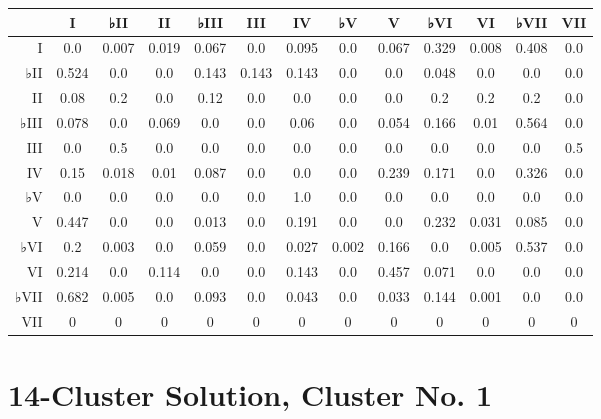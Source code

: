 \begin{table}[htbp]
\begin{minipage}{\linewidth}
\setlength{\tymax}{0.5\linewidth}
\centering
\small
\begin{tabulary}{\textwidth}{@{}RCCCCCCCCCCCC@{}} \toprule
&I&♭II&II&♭III&III&IV&♭V&V&♭VI&VI&♭VII&VII\\
\midrule
I&0.0&0.007&0.019&0.067&0.0&0.095&0.0&0.067&0.329&0.008&0.408&0.0\\
♭II&0.524&0.0&0.0&0.143&0.143&0.143&0.0&0.0&0.048&0.0&0.0&0.0\\
II&0.08&0.2&0.0&0.12&0.0&0.0&0.0&0.0&0.2&0.2&0.2&0.0\\
♭III&0.078&0.0&0.069&0.0&0.0&0.06&0.0&0.054&0.166&0.01&0.564&0.0\\
III&0.0&0.5&0.0&0.0&0.0&0.0&0.0&0.0&0.0&0.0&0.0&0.5\\
IV&0.15&0.018&0.01&0.087&0.0&0.0&0.0&0.239&0.171&0.0&0.326&0.0\\
♭V&0.0&0.0&0.0&0.0&0.0&1.0&0.0&0.0&0.0&0.0&0.0&0.0\\
V&0.447&0.0&0.0&0.013&0.0&0.191&0.0&0.0&0.232&0.031&0.085&0.0\\
♭VI&0.2&0.003&0.0&0.059&0.0&0.027&0.002&0.166&0.0&0.005&0.537&0.0\\
VI&0.214&0.0&0.114&0.0&0.0&0.143&0.0&0.457&0.071&0.0&0.0&0.0\\
♭VII&0.682&0.005&0.0&0.093&0.0&0.043&0.0&0.033&0.144&0.001&0.0&0.0\\
VII&0&0&0&0&0&0&0&0&0&0&0&0\\

\bottomrule

\end{tabulary}
\end{minipage}
\end{table}

\section{14-Cluster Solution, Cluster No. 1}
\label{14-clustersolutionclusterno.1}

